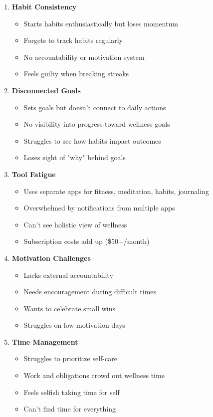 \begin{enumerate}
    \item \textbf{Habit Consistency}
    \begin{itemize}
        \item Starts habits enthusiastically but loses momentum
        \item Forgets to track habits regularly
        \item No accountability or motivation system
        \item Feels guilty when breaking streaks
    \end{itemize}
    
    \item \textbf{Disconnected Goals}
    \begin{itemize}
        \item Sets goals but doesn't connect to daily actions
        \item No visibility into progress toward wellness goals
        \item Struggles to see how habits impact outcomes
        \item Loses sight of "why" behind goals
    \end{itemize}
    
    \item \textbf{Tool Fatigue}
    \begin{itemize}
        \item Uses separate apps for fitness, meditation, habits, journaling
        \item Overwhelmed by notifications from multiple apps
        \item Can't see holistic view of wellness
        \item Subscription costs add up (\$50+/month)
    \end{itemize}
    
    \item \textbf{Motivation Challenges}
    \begin{itemize}
        \item Lacks external accountability
        \item Needs encouragement during difficult times
        \item Wants to celebrate small wins
        \item Struggles on low-motivation days
    \end{itemize}
    
    \item \textbf{Time Management}
    \begin{itemize}
        \item Struggles to prioritize self-care
        \item Work and obligations crowd out wellness time
        \item Feels selfish taking time for self
        \item Can't find time for everything
    \end{itemize}
\end{enumerate}

